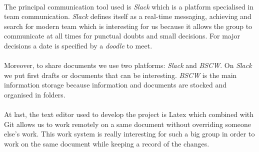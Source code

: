 \paragraph{}
The principal communication tool used is \textit{Slack} which is a platform specialised in team communication. \textit{Slack} defines itself as a real-time messaging, achieving and search for modern team which is interesting for us because it allows the group to communicate at all times for punctual doubts and small decisions. For major decisions a date is specified by a \textit{doodle} to meet.
\paragraph{}
Moreover, to share documents we use two platforms: \textit{Slack} and \textit{BSCW}. On \textit{Slack} we put first drafts or documents that can be interesting. \textit{BSCW} is the main information storage because information and documents are stocked and organised in folders.
\paragraph{}
At last, the text editor used to develop the project is Latex which combined with Git allows us to work remotely on a same document without overriding someone else's work. This work system is really interesting for such a big group in order to work on the same document while keeping a record of the changes. 